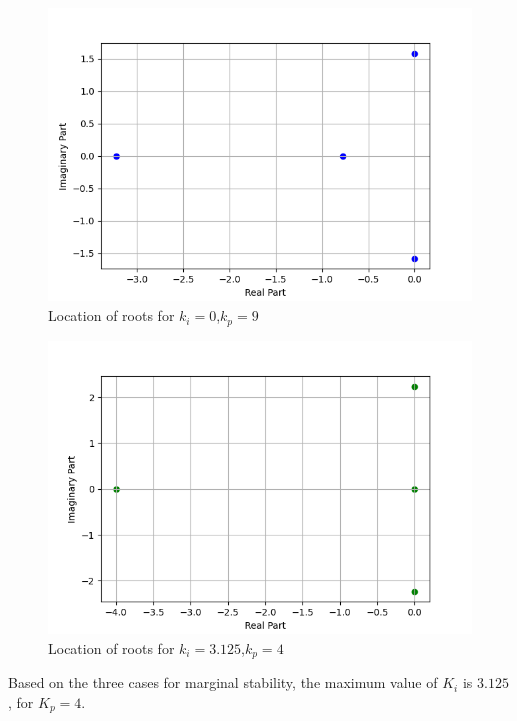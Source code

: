 \documentclass[journal,12pt,onecolumn]{IEEEtran}
\theoremstyle{remark}
\begin{document}
\begin{figure}[!ht]    
    \centering
\graphicspath{ {figs/} }
\includegraphics[width=\columnwidth]{graph_2}
\caption{Location of roots for $k_i=0$,$k_p=9$}
\label{figure:ee25-gate4-graph2}
\end{figure}

\begin{figure}[!ht]    
    \centering
\graphicspath{ {figs/} }
\includegraphics[width=\columnwidth]{graph_3}
\caption{Location of roots for $k_i=3.125$,$k_p=4$}
\label{figure:ee25-gate4-graph3}
\end{figure}
 
    Based on the three cases for marginal stability, the maximum value of $K_i$ is $3.125$, for $K_p = 4$.
   
    
\end{document}
